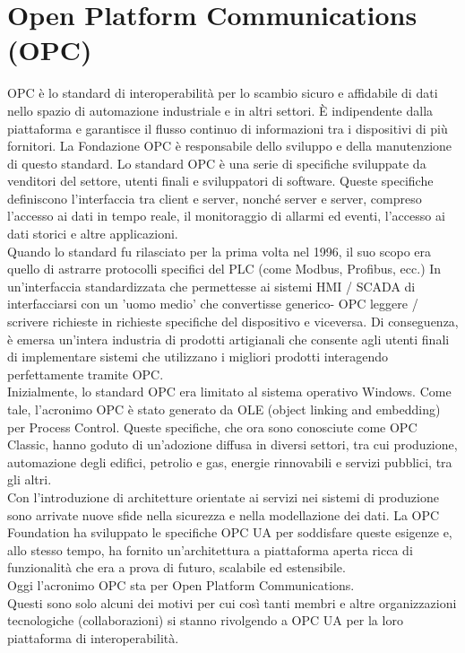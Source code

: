 \documentclass[12pt, a4paper, oneside]{book}
\begin{document}
\section{Open Platform Communications (OPC)}
OPC \cite{OCP} è lo standard di interoperabilità per lo scambio sicuro e affidabile di dati nello spazio di automazione industriale e in altri settori. È indipendente dalla piattaforma e garantisce il flusso continuo di informazioni tra i dispositivi di più fornitori. La Fondazione OPC è responsabile dello sviluppo e della manutenzione di questo standard.
Lo standard OPC è una serie di specifiche sviluppate da venditori del settore, utenti finali e sviluppatori di software. Queste specifiche definiscono l'interfaccia tra client e server, nonché server e server, compreso l'accesso ai dati in tempo reale, il monitoraggio di allarmi ed eventi, l'accesso ai dati storici e altre applicazioni.
\\Quando lo standard fu rilasciato per la prima volta nel 1996, il suo scopo era quello di astrarre protocolli specifici del PLC (come Modbus, Profibus, ecc.) In un'interfaccia standardizzata che permettesse ai sistemi HMI / SCADA di interfacciarsi con un 'uomo medio' che convertisse generico- OPC leggere / scrivere richieste in richieste specifiche del dispositivo e viceversa. Di conseguenza, è emersa un'intera industria di prodotti artigianali che consente agli utenti finali di implementare sistemi che utilizzano i migliori prodotti interagendo perfettamente tramite OPC.
\\Inizialmente, lo standard OPC era limitato al sistema operativo Windows. Come tale, l'acronimo OPC è stato generato da OLE (object linking and embedding) per Process Control. Queste specifiche, che ora sono conosciute come OPC Classic, hanno goduto di un'adozione diffusa in diversi settori, tra cui produzione, automazione degli edifici, petrolio e gas, energie rinnovabili e servizi pubblici, tra gli altri.
\\Con l'introduzione di architetture orientate ai servizi nei sistemi di produzione sono arrivate nuove sfide nella sicurezza e nella modellazione dei dati. La OPC Foundation ha sviluppato le specifiche OPC UA per soddisfare queste esigenze e, allo stesso tempo, ha fornito un'architettura a piattaforma aperta ricca di funzionalità che era a prova di futuro, scalabile ed estensibile.
\\Oggi l'acronimo OPC sta per Open Platform Communications.
\\Questi sono solo alcuni dei motivi per cui così tanti membri e altre organizzazioni tecnologiche (collaborazioni) si stanno rivolgendo a OPC UA per la loro piattaforma di interoperabilità.
\end{document}
